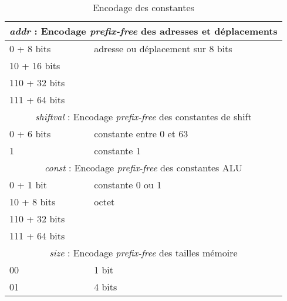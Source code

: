 \documentclass[architecture]{compas2018}
\begin{document}
\begin{table}
  \label{tab:constantes}
  \centering
  \caption{Encodage des constantes}
  \begin{tabular}{|l|l|}
    \hline
    \multicolumn{2}{|c|}{\textit{addr} : Encodage \emph{prefix-free} des adresses et déplacements} \\
    \hline
    0 + 8 bits    & adresse ou déplacement sur 8 bits                                              \\
    \hline
    10 + 16 bits  &                                                                                \\
    \hline
    110 + 32 bits &                                                                                \\
    \hline
    111 + 64 bits &                                                                                \\
    \hline
    \hline
    \multicolumn{2}{|c|}{\textit{shiftval} : Encodage \emph{prefix-free} des constantes de shift}  \\
    \hline
    0 + 6 bits    & constante entre 0 et 63                                                        \\
    \hline
    1             & constante 1                                                                    \\
    \hline
    \hline
    \multicolumn{2}{|c|}{\textit{const} : Encodage \emph{prefix-free} des constantes ALU}          \\
    \hline
    0 + 1 bit     & constante 0 ou 1                                                               \\
    \hline
    10 + 8 bits   & octet                                                                          \\
    \hline
    110 + 32 bits &                                                                                \\
    \hline
    111 + 64 bits &                                                                                \\
    \hline
    \hline
    \multicolumn{2}{|c|}{\textit{size} : Encodage \emph{prefix-free} des tailles mémoire}          \\
    \hline
    00            & 1 bit                                                                          \\
    \hline
    01            & 4 bits                                                                         \\

\end{tabular}
\end{table}
\end{document}
